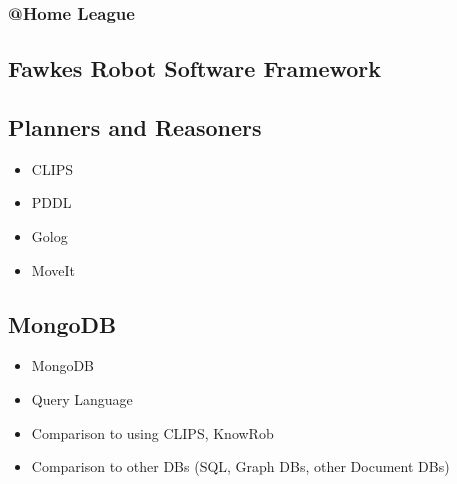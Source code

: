 \documentclass[a4paper,11pt]{article}
\begin{document}

\subsubsection{@Home League}


\subsection{Fawkes Robot Software Framework}
\label{sec:fawkes}


\subsection{Planners and Reasoners}
\label{sec:planners}
\begin{itemize}
\item CLIPS
\item PDDL
\item Golog
\item MoveIt
\end{itemize}
\subsection{MongoDB}
\label{sec:mongodb}
\begin{itemize}
\item MongoDB
\item Query Language
\item Comparison to using CLIPS, KnowRob
\item Comparison to other DBs (SQL, Graph DBs, other Document DBs)
\end{itemize}
\end{document}
